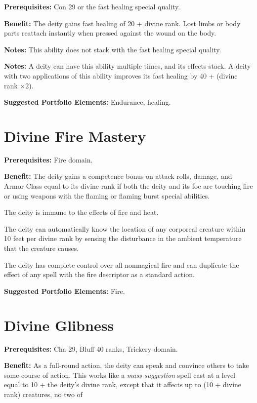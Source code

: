 \documentclass{article}
\begin{document}
\textbf{Prerequisites:} Con 29 or the fast healing special quality.

\textbf{Benefit:} The deity gains fast healing of 20 + divine rank. Lost limbs 
or body parts reattach instantly when pressed against the wound on the body.

\textbf{Notes:} This ability does not stack with the fast healing special quality.

\textbf{Notes:} A deity can have this ability multiple times, and its effects stack. 
A deity with two applications of this ability improves its fast healing by 40 + 
(divine rank \ensuremath{\times}2).

\textbf{Suggested Portfolio Elements:} Endurance, healing.

\vspace{12pt}
\section*{Divine Fire Mastery}

\textbf{Prerequisites:} Fire domain.

\textbf{Benefit:} The deity gains a competence bonus on attack rolls, damage, and 
Armor Class equal to its divine rank if both the deity and its foe are touching 
fire or using weapons with the flaming or flaming burst special abilities.

The deity is immune to the effects of fire and heat.

The deity can automatically know the location of any corporeal creature within 
10 feet per divine rank by sensing the disturbance in the ambient temperature that 
the creature causes.

The deity has complete control over all nonmagical fire and can duplicate the effect 
of any spell with the fire descriptor as a standard action.

\textbf{Suggested Portfolio Elements:} Fire.

\vspace{12pt}
\section*{Divine Glibness}

\textbf{Prerequisites:} Cha 29, Bluff 40 ranks, Trickery domain.

\textbf{Benefit:} As a full-round action, the deity can speak and convince others 
to take some course of action. This works like a \textit{mass suggestion }spell 
cast at a level equal to 10 + the deity's divine rank, except that it affects up 
to (10 + divine rank) creatures, no two of
\end{document}
